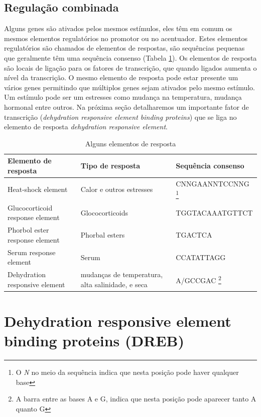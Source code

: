 \subsection{Regulação combinada}

Alguns genes são ativados pelos mesmos estímulos, eles têm em comum os mesmos elementos regulatórios no promotor ou no acentuador. Estes elementos regulatórios são chamados de elementos de respostas, são sequências pequenas que geralmente têm uma sequência consenso (Tabela \ref{Taq}). Os elementos de resposta são locais de ligação para os fatores de transcrição, que quando ligados aumenta o nível da transcrição. O mesmo elemento de resposta pode estar presente um vários genes permitindo que múltiplos genes sejam ativados pelo mesmo estímulo. Um estímulo pode ser um estresses como mudança na temperatura, mudança hormonal entre outros. Na próxima seção detalharemos um importante fator de transcrição (\textit{dehydration responsive element binding proteins}) que se liga no elemento de resposta \textit{dehydration responsive element}.

\begin{table}[H]
\begin{tabularx}{\textwidth}{ |X|X|X| }    \hline 
		  	Elemento de resposta      & Tipo de resposta & Sequência consenso         \\ \hline \hline

    Heat-shock element & Calor e outros estresses & CNNGAANNTCCNNG \footnote{O \textit{N} no meio da sequência indica que nesta posição pode haver qualquer base} \\ \hline
	Glucocorticoid response element & Glococorticoids & TGGTACAAATGTTCT\\ \hline
    Phorbol ester response element & Phorbal esters & TGACTCA \\ \hline
    Serum response element & Serum & CCATATTAGG \\ \hline
	Dehydration responsive element & mudanças de temperatura, alta salinidade, e seca& A/GCCGAC \footnote{A barra entre as bases A e G, indica que nesta posição pode aparecer tanto A quanto G}\\ \hline

\end{tabularx}
\caption{Alguns elementos de resposta}
\label{Taq}
\end{table}

\section{Dehydration responsive element binding proteins (DREB)}

